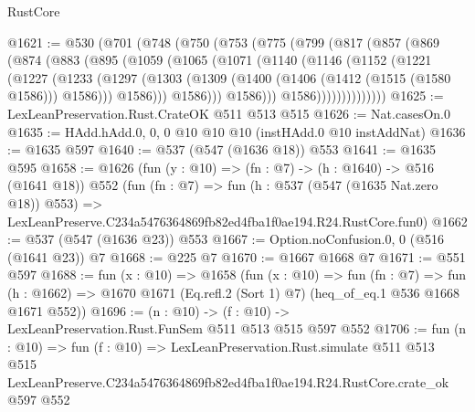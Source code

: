 \begin{lexlean}{RustCore}
\begin{coremodule}
@1621 := @530
    (@701
      (@748
        (@750
          (@753
            (@775
              (@799
                (@817
                  (@857
                    (@869
                      (@874
                        (@883
                          (@895
                            (@1059
                              (@1065
                                (@1071
                                  (@1140
                                    (@1146
                                      (@1152
                                        (@1221
                                          (@1227
                                            (@1233
                                              (@1297
                                                (@1303
                                                  (@1309
                                                    (@1400
                                                      (@1406 (@1412 (@1515 (@1580 @1586))) @1586)))
                                                  @1586)))
                                            @1586)))
                                      @1586)))
                                @1586))))))))))))))
@1625 := LexLeanPreservation.Rust.CrateOK @511 @513 @515
@1626 := Nat.casesOn.{0}
@1635 := HAdd.hAdd.{0, 0, 0} @10 @10 @10 (instHAdd.{0} @10 instAddNat)
@1636 := @1635 @597
@1640 := @537 (@547 (@1636 @18)) @553
@1641 := @1635 @595
@1658 := @1626
    (fun (y : @10) => (fn : @7) -> (h : @1640) -> @516 (@1641 @18))
    @552
    (fun (fn : @7) =>
    fun (h : @537 (@547 (@1635 Nat.zero @18)) @553) =>
    LexLeanPreserve.C234a5476364869fb82ed4fba1f0ae194.R24.RustCore.fun0)
@1662 := @537 (@547 (@1636 @23)) @553
@1667 := Option.noConfusion.{0, 0} (@516 (@1641 @23)) @7
@1668 := @225 @7
@1670 := @1667 @1668 @7
@1671 := @551 @597
@1688 := fun (x : @10) =>
  @1658
    (fun (x : @10) =>
    fun (fn : @7) =>
    fun (h : @1662) => @1670 @1671 (Eq.refl.{2} (Sort 1) @7) (heq_of_eq.{1} @536 @1668 @1671 @552))
@1696 := (n : @10) -> (f : @10) -> LexLeanPreservation.Rust.FunSem @511 @513 @515 @597 @552
@1706 := fun (n : @10) =>
  fun (f : @10) =>
  LexLeanPreservation.Rust.simulate
    @511
    @513
    @515
    LexLeanPreserve.C234a5476364869fb82ed4fba1f0ae194.R24.RustCore.crate_ok
    @597
    @552
\end{coremodule}
\end{lexlean}

